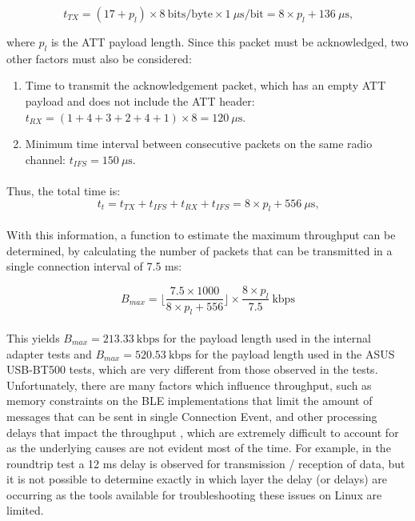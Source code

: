 \begin{equation}
    t_{TX} = (17 + p_{l}) \times 8\ \text{bits/byte} \times 1\ \mu\text{s}/\text{bit} = 8\times p_l + 136\ \mu\text{s,}
\end{equation}

where $p_{l}$ is the \acs{ATT} payload length. Since this packet must be acknowledged, two other factors must also be considered: 

\begin{enumerate}
    \item Time to transmit the acknowledgement packet, which has an empty \acs{ATT} payload and does not include the \acs{ATT} header: $t_{RX} = (1+4+3+2+4+1)\times 8 = 120\ \mu\text{s}$.
    \item Minimum time interval between consecutive packets on the same radio channel: $t_{IFS} = 150\ \mu\text{s}$.
\end{enumerate}

\paragraph{} Thus, the total time is:
\begin{equation}
    t_{t} = t_{TX}+ t_{IFS}+ t_{RX} + t_{IFS} =  8\times p_l  + 556\ \mu\text{s,}
\end{equation}

\paragraph{} With this information, a function to estimate the maximum throughput can be determined, by calculating the number of packets that can be transmitted in a single connection interval of 7.5 ms:

\begin{equation}
    B_{max} = \bigg\lfloor \frac{7.5\times 1000}{8\times p_l  + 556} \bigg\rfloor\times \frac{8\times p_l}{7.5}\ \text{kbps}
\end{equation}

\paragraph{} This yields $B_{max}=213.33\ \text{kbps}$ for the payload length used in the internal adapter tests and $B_{max}=520.53\ \text{kbps}$ for the payload length used in the ASUS USB-BT500 tests, which are very different from those observed in the tests. Unfortunately, there are many factors which influence throughput, such as memory constraints on the \acs{BLE} implementations that limit the amount of messages that can be sent in single Connection Event, and other processing delays that impact the throughput \cite{Gomez2012}, which are extremely difficult to account for as the underlying causes are not evident most of the time. For example, in the roundtrip test a 12 ms delay is observed for transmission / reception of data, but it is not possible to determine exactly in which layer the delay (or delays) are occurring as the tools available for troubleshooting these issues on Linux are limited.

